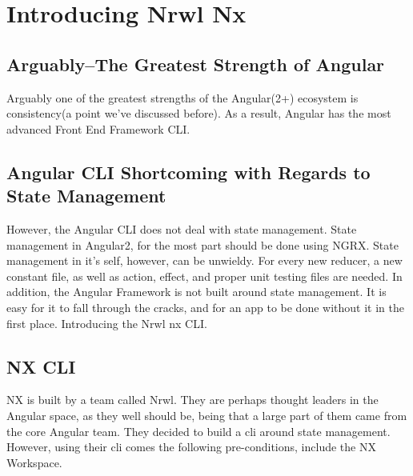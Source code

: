 \maketitle{}
\section{Introducing Nrwl Nx}

\subsection{Arguably–The Greatest Strength of Angular}

Arguably one of the greatest strengths of the Angular(2+) ecosystem is
consistency(a point we've discussed before). As a result, Angular has the most
advanced Front End Framework CLI.

\subsection{Angular CLI Shortcoming with Regards to State Management}

However, the Angular CLI does not deal with state management. State management
in Angular2, for the most part should be done using NGRX. State management in
it's self, however, can be unwieldy. For every new reducer, a new constant file,
as well as action, effect, and proper unit testing files are needed.
In addition, the Angular Framework is not built around state management. It is
easy for it to fall through the cracks, and for an app to be done without it in
the first place. Introducing the Nrwl nx CLI.

\subsection{NX CLI}
NX is built by a team called Nrwl. They are perhaps thought leaders in the
Angular space, as they well should be, being that a large part of them came
from the core Angular team. They decided to build a cli around state management.
However, using their cli comes the following pre-conditions, include the NX
Workspace.
